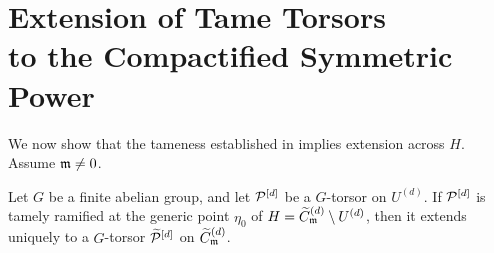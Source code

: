 \section[Extension of Tame Torsors to the Compactified Symmetric Power]{\texorpdfstring{Extension of Tame Torsors\\to the Compactified Symmetric Power}{Extension of Tame Torsors to the Compactified Symmetric Power}}\label{section:extension-across-boundary}

We now show that the tameness established in
 implies extension
across $H$. Assume $\mathfrak{m}\ne0$.

\begin{lemma}\label{lemma:ExtensionOfTamelyRamifiedSheaf}
Let $G$ be a finite abelian group, and let $\mathcal{P}^{[d]}$ be a
$G$-torsor on $U^{(d)}$. If $\mathcal{P}^{[d]}$ is tamely ramified at the generic
point $\eta_0$ of $H=\widetilde{C}_{\mathfrak{m}}^{(d)}\setminus U^{(d)}$, then it extends uniquely
to a $G$-torsor $\widetilde{\mathcal{P}}^{[d]}$ on $\widetilde{C}_{\mathfrak{m}}^{(d)}$.
\end{lemma}

